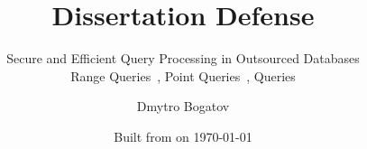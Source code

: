 \title{Dissertation Defense}

\subtitle{
	Secure and Efficient Query Processing in Outsourced Databases \\
	{\small Range Queries~\cite{ore-benchmark-17, epsolute}, Point Queries~\cite{epsolute}, \knn{} Queries}
}

\date{Built from \href{https://git.dbogatov.org/bu/defense/presentation/commit/\version}{\emph{\version}} on \today}

\author{Dmytro Bogatov \\ }


\def\wm{\begin{tabular}{c} Dmytro Bogatov \\ Boston University \end{tabular}}
